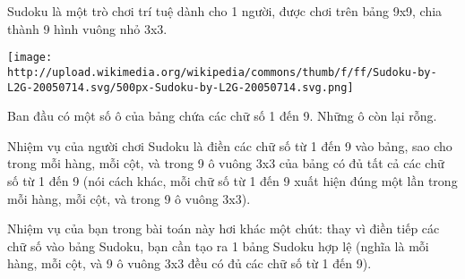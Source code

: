 Sudoku là một trò chơi trí tuệ dành cho 1 người, được chơi trên bảng 9x9, chia thành 9 hình vuông nhỏ 3x3.


\texttt{[image: http://upload.wikimedia.org/wikipedia/commons/thumb/f/ff/Sudoku-by-L2G-20050714.svg/500px-Sudoku-by-L2G-20050714.svg.png]}

Ban đầu có một số ô của bảng chứa các chữ số 1 đến 9. Những ô còn lại rỗng.

Nhiệm vụ của người chơi Sudoku là điền các chữ số từ 1 đến 9 vào bảng, sao cho trong mỗi hàng, mỗi cột, và trong 9 ô vuông 3x3 của bảng có đủ tất cả các chữ số từ 1 đến 9 (nói cách khác, mỗi chữ số từ 1 đến 9 xuất hiện đúng một lần trong mỗi hàng, mỗi cột, và trong 9 ô vuông 3x3).

Nhiệm vụ của bạn trong bài toán này hơi khác một chút: thay vì điền tiếp các chữ số vào bảng Sudoku, bạn cần tạo ra 1 bảng Sudoku hợp lệ (nghĩa là mỗi hàng, mỗi cột, và 9 ô vuông 3x3 đều có đủ các chữ số từ 1 đến 9).